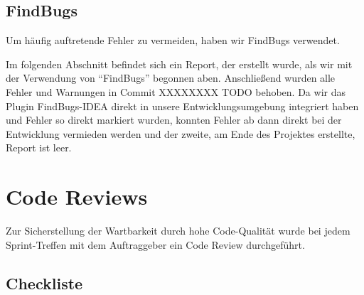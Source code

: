 \clearpage
\subsection{FindBugs}

Um häufig auftretende Fehler zu vermeiden, haben wir FindBugs verwendet.

Im folgenden Abschnitt befindet sich ein Report, der erstellt wurde, als wir mit der Verwendung von ``FindBugs'' begonnen aben. Anschließend wurden alle Fehler und Warnungen in Commit XXXXXXXX TODO behoben. Da wir das Plugin FindBugs-IDEA direkt in unsere Entwicklungsumgebung integriert haben und Fehler so direkt markiert wurden, konnten Fehler ab dann direkt bei der Entwicklung vermieden werden und der zweite, am Ende des Projektes erstellte, Report ist leer.









\clearpage


\section{Code Reviews}

Zur Sicherstellung der Wartbarkeit durch hohe Code-Qualität wurde bei jedem
Sprint-Treffen mit dem Auftraggeber ein Code Review durchgeführt.


\subsection{Checkliste}

